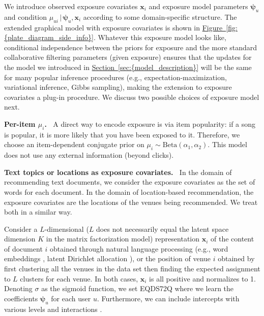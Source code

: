 \documentclass{sig-alternate-arxiv}
\begin{document}
We introduce observed exposure covariates $\mathbf{x}_i$ and exposure model parameters $\boldsymbol\psi_{u}$ 
and condition $\mu_{ui} {\,\vert\,} \boldsymbol{\psi}_{u}, \boldsymbol{x}_{i}$ 
according to some domain-specific structure. 
The extended graphical model with exposure covariates 
is shown in {\hyperref[fig:{plate_diagram_side_info}]{Figure~\ref*{fig:{plate_diagram_side_info}}}}. 
Whatever this exposure model looks like, 
conditional independence between the priors for exposure 
and the more standard collaborative filtering parameters (given exposure) 
ensures that the updates for the model we introduced in {\hyperref[sec:{model_description}]{Section~\ref*{sec:{model_description}}}}
will be the same for many popular inference procedures (e.g., expectation-maximization, variational inference, Gibbs sampling), 
making the extension to exposure covariates a plug-in procedure. 
We discuss two possible choices of exposure model next.

{\vspace{0.1in}\noindent \textbf{{Per-item $\mu_i$.} \,}} A direct way to encode exposure is via item
popularity: if a song is popular, it is more likely that you have been
exposed to it. Therefore, we choose an item-dependent conjugate prior on
$\mu_i \sim \mathrm{Beta}(\alpha_1, \alpha_2)$. This model does not use
any external information (beyond clicks). 

{\vspace{0.1in}\noindent \textbf{{Text topics or locations as exposure covariates.} \,}} 
In the domain of recommending text documents, 
we consider the exposure covariates as the set of words 
for each document. 
In the domain of location-based recommendation, 
the exposure covariates are the locations of the venues being recommended. 
We treat both in a similar way. 

Consider a $L$-dimensional ($L$ does not necessarily equal the latent space dimension $K$ in the matrix factorization model) representation $\mathbf{x}_i$ 
of the content of document $i$ 
obtained through natural language processing (e.g., word embeddings \cite{mikolov2013distributed}, latent Dirichlet allocation \cite{blei2003latent}), 
or the position of venue $i$ obtained by first clustering all the venues in the data set 
then finding the expected assignment to $L$ clusters 
for each venue. 
In both cases, $\mathbf{x}_i$ is all positive and normalizes to 1. 
Denoting $\sigma$ as the sigmoid function, 
we set
EQDS72Q
where we learn the coefficients $\boldsymbol\psi_u$ 
for each user $u$. Furthermore, we can include intercepts with various levels and interactions \cite{gelman2006data}. 
\end{document}
